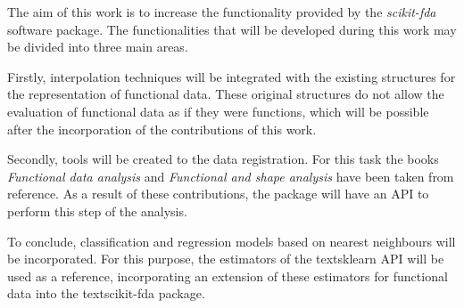 The aim of this work is to increase the functionality provided by the
\textit{scikit-fda} software package. The functionalities that will
be developed during this work may be divided into three main areas.

Firstly, interpolation techniques will be integrated with the existing
structures for the representation of functional data. These original structures
do not allow the evaluation of functional data as if they were functions,
which will be possible after the incorporation of the contributions of this work.

Secondly, tools will be created to the data registration. For this task
the books \textit{Functional data analysis}\cite{Ramsay2005} and
\textit{Functional and shape analysis}\cite{Srivastava2016} have been taken from
reference. As a result of these contributions, the package will have an API
to perform this step of the analysis.

To conclude, classification and regression models based on nearest neighbours
will be incorporated. For this purpose,
the estimators of the text{sklearn}\cite{sklearn} API will be used as a reference,
incorporating an extension of these estimators for functional data
into the text{scikit-fda} package.
